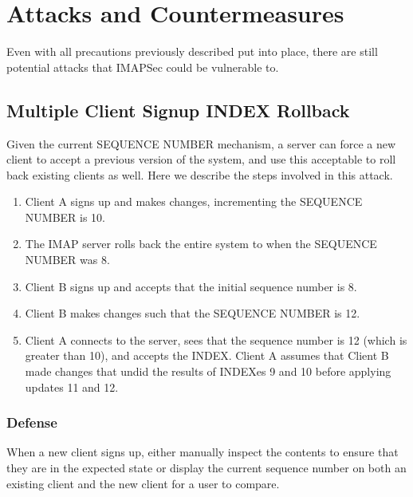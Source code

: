\documentclass[pageno]{jpaper}
\newcommand{\project}{IMAPSec }
\begin{document}
\section{Attacks and Countermeasures}

Even with all precautions previously described put into place, there are still potential attacks that \project could be vulnerable to.

\subsection{Multiple Client Signup INDEX Rollback}

Given the current SEQUENCE NUMBER mechanism, a server can force a new client to accept a previous version of the system, and use this acceptable to roll back existing clients as well. Here we describe the steps involved in this attack.

\begin{enumerate}
\item Client A signs up and makes changes, incrementing the SEQUENCE NUMBER is 10.
\item The IMAP server rolls back the entire system to when the SEQUENCE NUMBER was 8.
\item Client B signs up and accepts that the initial sequence number is 8.
\item Client B makes changes such that the SEQUENCE NUMBER is 12.
\item Client A connects to the server, sees that the sequence number is 12 (which is greater than 10), and accepts the INDEX. Client A assumes that Client B made changes that undid the results of INDEXes 9 and 10 before applying updates 11 and 12.
\end{enumerate}

\subsubsection{Defense}
When a new client signs up, either manually inspect the contents to ensure that they are in the expected state or display the current sequence number on both an existing client and the new client for a user to compare.
\end{document}
